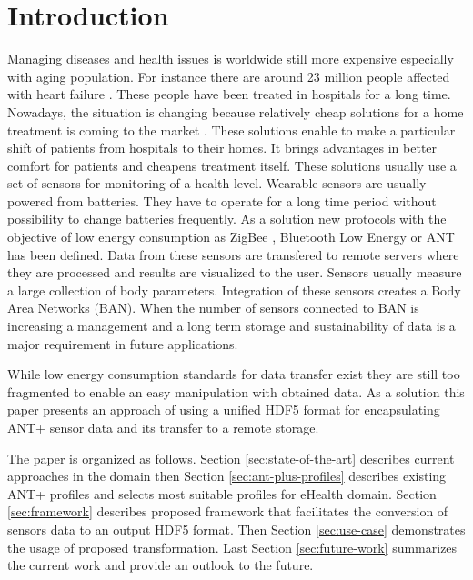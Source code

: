 \documentclass[conference]{IEEEconf}
\begin{document}
\section{Introduction}\label{sec:intro}
Managing diseases and health issues is worldwide still more expensive especially with aging population. For instance there are around 23 million people affected with heart failure \cite{bui2011epidemiology}. These people have been treated in hospitals for a long time. Nowadays, the situation is changing because relatively cheap solutions for a home treatment is coming to the market \cite{4761985, 5333913}. These solutions enable to make a particular shift of patients from hospitals to their homes. It brings advantages in better comfort for patients and cheapens treatment itself. These solutions usually use a set of sensors for monitoring of a health level. Wearable sensors are usually powered from batteries. They have to operate for a long time period without possibility to change batteries frequently. As a solution new protocols with the objective of low energy consumption as ZigBee \cite{Farahani:2008:ZWN:1457417}, Bluetooth Low Energy \cite{heydon2012bluetooth} or ANT \cite{zaloker2014ant} has been defined.  Data from these sensors are transfered to remote servers where they are processed and results are visualized to the user. Sensors usually measure a large collection of body parameters. Integration of these sensors creates a Body Area Networks (BAN). When the number of sensors connected to BAN is increasing a management and a long term storage and sustainability of data is a major requirement in future applications.

While low energy consumption standards for data transfer exist they are still too fragmented to enable an easy manipulation with obtained data. As a solution this paper presents an approach of using a unified HDF5 format for encapsulating ANT+ sensor data and its transfer to a remote storage. 

The paper is organized as follows. Section \ref{sec:state-of-the-art} describes current approaches in the domain then Section \ref{sec:ant-plus-profiles} describes existing ANT+ profiles and selects most suitable profiles for eHealth domain. Section \ref{sec:framework} describes proposed framework that facilitates the conversion of sensors data to an output HDF5 format. Then Section \ref{sec:use-case} demonstrates the usage of proposed transformation. Last Section \ref{sec:future-work} summarizes the current work and provide an outlook to the future.
\end{document}
